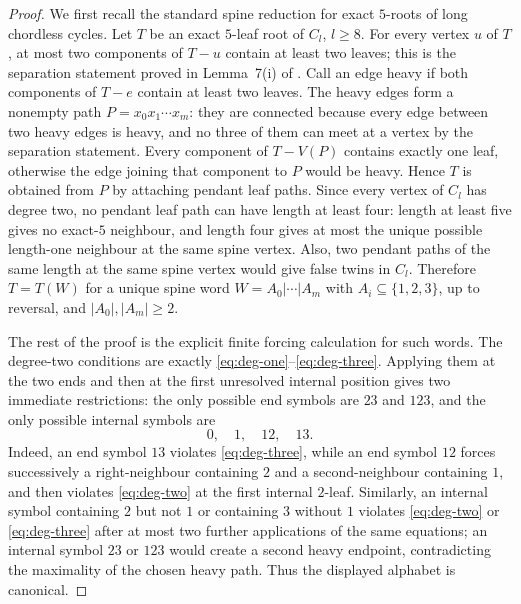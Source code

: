 \documentclass[11pt]{article}
\theoremstyle{definition}
\begin{document}
\begin{proof}
We first recall the standard spine reduction for exact $5$-roots of long chordless cycles.  Let $T$ be an exact $5$-leaf root of $C_l$, $l\ge8$.  For every vertex $u$ of $T$, at most two components of $T-u$ contain at least two leaves; this is the separation statement proved in Lemma~7(i) of \cite{BLR2010}.  Call an edge heavy if both components of $T-e$ contain at least two leaves.  The heavy edges form a nonempty path $P=x_0x_1\cdots x_m$: they are connected because every edge between two heavy edges is heavy, and no three of them can meet at a vertex by the separation statement.  Every component of $T-V(P)$ contains exactly one leaf, otherwise the edge joining that component to $P$ would be heavy.  Hence $T$ is obtained from $P$ by attaching pendant leaf paths.  Since every vertex of $C_l$ has degree two, no pendant leaf path can have length at least four: length at least five gives no exact-$5$ neighbour, and length four gives at most the unique possible length-one neighbour at the same spine vertex.  Also, two pendant paths of the same length at the same spine vertex would give false twins in $C_l$.  Therefore $T=T(W)$ for a unique spine word $W=A_0|\cdots|A_m$ with $A_i\subseteq\{1,2,3\}$, up to reversal, and $|A_0|,|A_m|\ge2$.

The rest of the proof is the explicit finite forcing calculation for such words.  The degree-two conditions are exactly \eqref{eq:deg-one}--\eqref{eq:deg-three}.  Applying them at the two ends and then at the first unresolved internal position gives two immediate restrictions: the only possible end symbols are $23$ and $123$, and the only possible internal symbols are
\[
 0,
 \quad 1,
 \quad 12,
 \quad 13.
\]
Indeed, an end symbol $13$ violates \eqref{eq:deg-three}, while an end symbol $12$ forces successively a right-neighbour containing $2$ and a second-neighbour containing $1$, and then violates \eqref{eq:deg-two} at the first internal $2$-leaf.  Similarly, an internal symbol containing $2$ but not $1$ or containing $3$ without $1$ violates \eqref{eq:deg-two} or \eqref{eq:deg-three} after at most two further applications of the same equations; an internal symbol $23$ or $123$ would create a second heavy endpoint, contradicting the maximality of the chosen heavy path.  Thus the displayed alphabet is canonical.


\end{proof}
\end{document}
